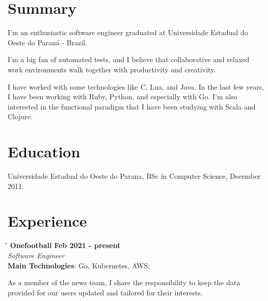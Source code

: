 \documentclass[margin]{res}
\begin{document}

\address{Berlin, Germany \\ cadicallegari@gmail.com \\ Phone: +49 0152 3663 8091}


\begin{resume}

\section{Summary}       I’m an enthusiastic software engineer graduated at Universidade Estadual do Oeste do Paraná - Brazil.

I'm a big fan of automated tests, and I believe that collaborative and relaxed work environments walk together with productivity and creativity.

I have worked with some technologies like C, Lua, and Java. In the last few years, I have been working with Ruby, Python, and especially with Go. I'm also interested in the functional paradigm that I have been studying with Scala and Clojure.

\section{Education} Universidade Estadual do Oeste do Parana, BSc in Computer Science, December 2011.

\section{Experience}

\vspace{-0.1in}
   \begin{tabbing}
   \hspace{2.3in}\= \hspace{1.7in}\= \kill %
    \textbf{Onefootball}    \>\>\textbf{Feb 2021 - present}\\
    \textit{Software Engineer}\\
    \textbf{Main Technologies}: Go, Kubernetes, AWS;
   \end{tabbing}\vspace{-20pt}      %
    \vspace{2mm}

As a member of the news team, I share the responsibility to keep the data provided for our users updated and tailored for their interests.


\end{resume}
\end{document}
